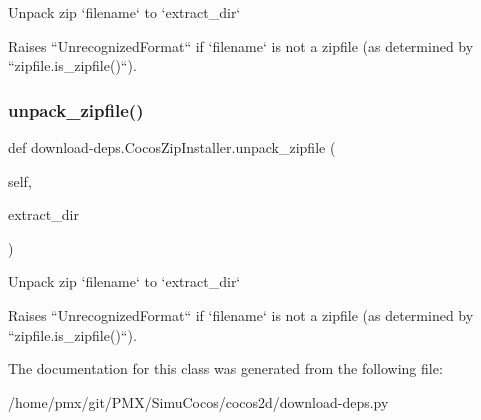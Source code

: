 \begin{DoxyVerb}Unpack zip `filename` to `extract_dir`

Raises ``UnrecognizedFormat`` if `filename` is not a zipfile (as determined
by ``zipfile.is_zipfile()``).
\end{DoxyVerb}
 \mbox{\label{classdownload-deps_1_1CocosZipInstaller_a93043957b5e9244249c31fd67636d3e6}} 
\subsubsection{\texorpdfstring{unpack\+\_\+zipfile()}{unpack\_zipfile()}\hspace{0.1cm}{\footnotesize\ttfamily [2/2]}}
{\footnotesize\ttfamily def download-\/deps.\+Cocos\+Zip\+Installer.\+unpack\+\_\+zipfile (\begin{DoxyParamCaption}\item[{}]{self,  }\item[{}]{extract\+\_\+dir }\end{DoxyParamCaption})}

\begin{DoxyVerb}Unpack zip `filename` to `extract_dir`

Raises ``UnrecognizedFormat`` if `filename` is not a zipfile (as determined
by ``zipfile.is_zipfile()``).
\end{DoxyVerb}
 

The documentation for this class was generated from the following file\+:\begin{DoxyCompactItemize}
\item 
/home/pmx/git/\+P\+M\+X/\+Simu\+Cocos/cocos2d/download-\/deps.\+py\end{DoxyCompactItemize}
